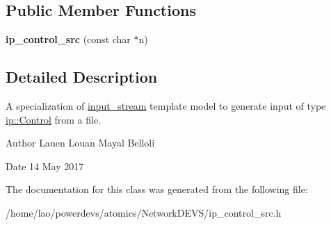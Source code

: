 \subsection*{Public Member Functions}
\begin{DoxyCompactItemize}
\item 
{\bfseries ip\+\_\+control\+\_\+src} (const char $\ast$n)\hypertarget{classip__control__src_a6046f82b5fd050f6ae6f24910f4a2a3c}{}\label{classip__control__src_a6046f82b5fd050f6ae6f24910f4a2a3c}

\end{DoxyCompactItemize}


\subsection{Detailed Description}
A specialization of \hyperlink{classinput__stream}{input\+\_\+stream} template model to generate input of type \hyperlink{structip_1_1Control}{ip\+::\+Control} from a file. 

\begin{DoxyAuthor}{Author}
Lauen Louan Mayal Belloli 
\end{DoxyAuthor}
\begin{DoxyDate}{Date}
14 May 2017 
\end{DoxyDate}


The documentation for this class was generated from the following file\+:\begin{DoxyCompactItemize}
\item 
/home/lao/powerdevs/atomics/\+Network\+D\+E\+V\+S/ip\+\_\+control\+\_\+src.\+h\end{DoxyCompactItemize}
